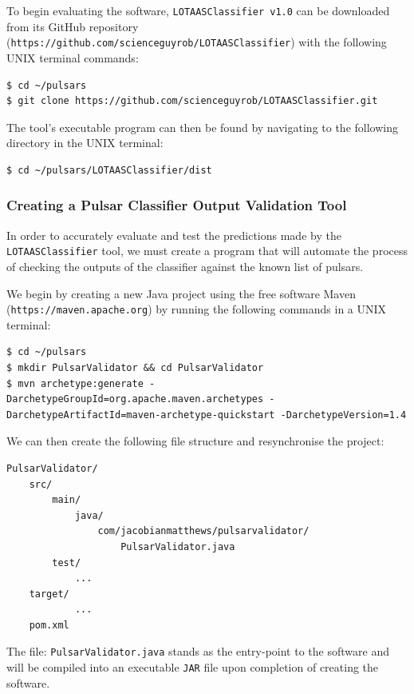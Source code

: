 \documentclass{article}
\begin{document}
To begin evaluating the software, \verb|LOTAASClassifier v1.0| can be downloaded from its GitHub repository \\(\verb|https://github.com/scienceguyrob/LOTAASClassifier|) with the following UNIX terminal commands:

\begin{lstlisting}[numbers=none]
$ cd ~/pulsars
$ git clone https://github.com/scienceguyrob/LOTAASClassifier.git
\end{lstlisting}

The tool's executable program can then be found by navigating to the following directory in the UNIX terminal:

\begin{lstlisting}[numbers=none]
$ cd ~/pulsars/LOTAASClassifier/dist
\end{lstlisting}

\subsubsection{Creating a Pulsar Classifier Output Validation Tool}
\label{sec:methodvalidate}
In order to accurately evaluate and test the predictions made by the \verb|LOTAASClassifier| tool, we must create a program that will automate the process of checking the outputs of the classifier against the known list of pulsars.

We begin by creating a new Java project using the free software Maven (\verb|https://maven.apache.org|) by running the following commands in a UNIX terminal:

\begin{lstlisting}[numbers=none]
$ cd ~/pulsars
$ mkdir PulsarValidator && cd PulsarValidator
$ mvn archetype:generate -DarchetypeGroupId=org.apache.maven.archetypes -DarchetypeArtifactId=maven-archetype-quickstart -DarchetypeVersion=1.4
\end{lstlisting}

We can then create the following file structure and resynchronise the project:

\begin{lstlisting}[numbers=none]
PulsarValidator/
    src/
        main/
            java/
                com/jacobianmatthews/pulsarvalidator/
                    PulsarValidator.java
        test/
            ...
    target/
            ...
    pom.xml
\end{lstlisting}

The file: \verb|PulsarValidator.java| stands as the entry-point to the software and will be compiled into an executable \verb|JAR| file upon completion of creating the software.
\end{document}
